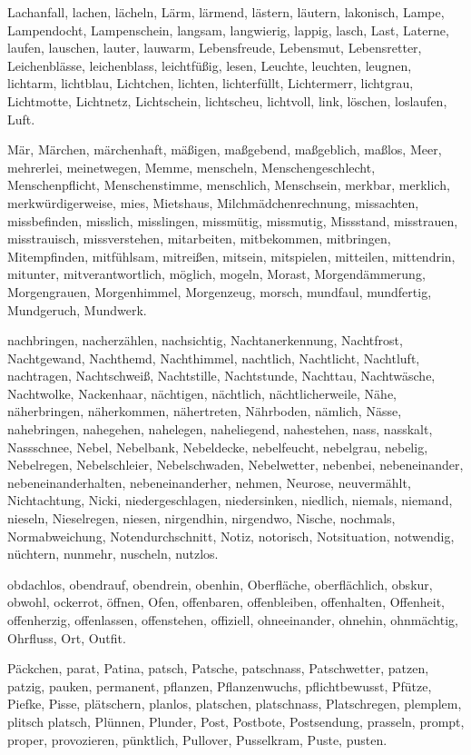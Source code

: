 \documentclass[a4paper,10pt,fleqn,twocolumn,twoside,dvipdfmx]{scrartcl}
\begin{document}
Lachanfall,
lachen,
lächeln,
Lärm,
lärmend,
lästern,
läutern,
lakonisch,
Lampe,
Lampendocht,
Lampenschein,
langsam,
langwierig,
lappig,
lasch,
Last,
Laterne,
laufen,
lauschen,
lauter,
lauwarm,
Lebensfreude,
Lebensmut,
Lebensretter,
Leichenblässe,
leichenblass,
leichtfüßig,
lesen,
Leuchte,
leuchten,
leugnen,
lichtarm,
lichtblau,
Lichtchen,
lichten,
lichterfüllt,
Lichtermerr,
lichtgrau,
Lichtmotte,
Lichtnetz,
Lichtschein,
lichtscheu,
lichtvoll,
link,
löschen,
loslaufen,
Luft.

Mär,
Märchen,
märchenhaft,
mäßigen,
maßgebend,
maßgeblich,
maßlos,
Meer,
mehrerlei,
meinetwegen,
Memme,
menscheln,
Menschengeschlecht,
Menschenpflicht,
Menschenstimme,
menschlich,
Menschsein,
merkbar,
merklich,
merkwürdigerweise,
mies,
Mietshaus,
Milchmädchenrechnung,
missachten,
missbefinden,
misslich,
misslingen,
missmütig,
missmutig,
Missstand,
misstrauen,
misstrauisch,
missverstehen,
mitarbeiten,
mitbekommen,
mitbringen,
Mitempfinden,
mitfühlsam,
mitreißen,
mitsein,
mitspielen,
mitteilen,
mittendrin,
mitunter,
mitverantwortlich,
möglich,
mogeln,
Morast,
Morgendämmerung,
Morgengrauen,
Morgenhimmel,
Morgenzeug,
morsch,
mundfaul,
mundfertig,
Mundgeruch,
Mundwerk.

nachbringen,
nacherzählen,
nachsichtig,
Nachtanerkennung,
Nachtfrost,
Nachtgewand,
Nachthemd,
Nachthimmel,
nachtlich,
Nachtlicht,
Nachtluft,
nachtragen,
Nachtschweiß,
Nachtstille,
Nachtstunde,
Nachttau,
Nachtwäsche,
Nachtwolke,
Nackenhaar,
nächtigen,
nächtlich,
nächtlicherweile,
Nähe,
näherbringen,
näherkommen,
nähertreten,
Nährboden,
nämlich,
Nässe,
nahebringen,
nahegehen,
nahelegen,
naheliegend,
nahestehen,
nass,
nasskalt,
Nassschnee,
Nebel,
Nebelbank,
Nebeldecke,
nebelfeucht,
nebelgrau,
nebelig,
Nebelregen,
Nebelschleier,
Nebelschwaden,
Nebelwetter,
nebenbei,
nebeneinander,
nebeneinanderhalten,
nebeneinanderher,
nehmen,
Neurose,
neuvermählt,
Nichtachtung,
Nicki,
niedergeschlagen,
niedersinken,
niedlich,
niemals,
niemand,
nieseln,
Nieselregen,
niesen,
nirgendhin,
nirgendwo,
Nische,
nochmals,
Normabweichung,
Notendurchschnitt,
Notiz,
notorisch,
Notsituation,
notwendig,
nüchtern,
nunmehr,
nuscheln,
nutzlos.

obdachlos,
obendrauf,
obendrein,
obenhin,
Oberfläche,
oberflächlich,
obskur,
obwohl,
ockerrot,
öffnen,
Ofen,
offenbaren,
offenbleiben,
offenhalten,
Offenheit,
offenherzig,
offenlassen,
offenstehen,
offiziell,
ohneeinander,
ohnehin,
ohnmächtig,
Ohrfluss,
Ort,
Outfit.

Päckchen,
parat,
Patina,
patsch,
Patsche,
patschnass,
Patschwetter,
patzen,
patzig,
pauken,
permanent,
pflanzen,
Pflanzenwuchs,
pflichtbewusst,
Pfütze,
Piefke,
Pisse,
plätschern,
planlos,
platschen,
platschnass,
Platschregen,
plemplem,
plitsch platsch,
Plünnen,
Plunder,
Post,
Postbote,
Postsendung,
prasseln,
prompt,
proper,
provozieren,
pünktlich,
Pullover,
Pusselkram,
Puste,
pusten.
\end{document}
